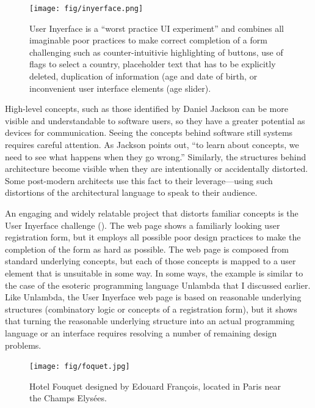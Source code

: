 \begin{figure}
\centering
\texttt{[image: fig/inyerface.png]}
\caption{User Inyerface is a ``worst practice UI experiment'' and combines all imaginable
poor practices to make correct completion of a form challenging such as counter-intuitivie
highlighting of buttons, use of flags to select a country, placeholder text that has to be
explicitly deleted, duplication of information (age and date of birth, or inconvenient user
interface elements (age slider).}
\label{fig:inyerface}
\end{figure}

High-level concepts, such as those identified by Daniel Jackson can be more visible and
understandable to software users, so they have a greater potential as devices for communication.
Seeing the concepts behind software still systems requires careful attention. As Jackson points
out, ``to learn about concepts, we need to see what happens when they go wrong.''
Similarly, the structures behind architecture become visible when they are intentionally or accidentally
distorted. Some post-modern architects use this fact to their leverage---using such
distortions of the architectural language to speak to their audience.

An engaging and widely relatable project that distorts familiar concepts is the User
Inyerface challenge (). The web page shows a familiarly looking
user registration form, but it employs all possible poor design practices to make the completion
of the form as hard as possible. The web page is composed from standard underlying concepts,
but each of those concepts is mapped to a user element that is unsuitable in some way.
In some ways, the example is similar to the case of the esoteric programming language Unlambda
that I discussed earlier. Like Unlambda, the User Inyerface web page is based on reasonable
underlying structures (combinatory logic or concepts of a registration form), but it shows that
turning the reasonable underlying structure into an actual programming language or an interface
requires resolving a number of remaining design problems.

\begin{figure}
\centering
\vspace{-1em}
\texttt{[image: fig/foquet.jpg]}
\caption{Hotel Fouquet designed by Edouard Fran\c{c}ois, located in Paris near the Champs Elys\'ees.}
\label{fig:hotel}
\end{figure}

